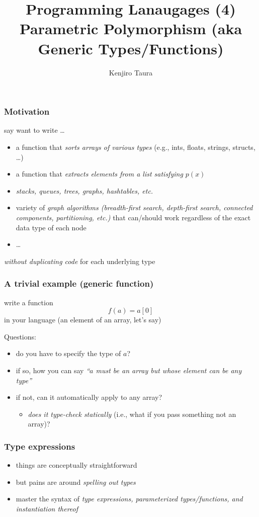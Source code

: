 \documentclass[12pt,dvipdfmx]{beamer}
\title{Programming Lanaugages (4) \\
Parametric Polymorphism (aka Generic Types/Functions)}
\institute{}
\author{Kenjiro Taura}
\date{}
\newcommand{\ao}[1]{{\color{blue}#1}}
\newcommand{\aka}[1]{{\color{red}#1}}
\begin{document}
\maketitle


\begin{frame}[fragile]
  \frametitle{Motivation}
  say want to write \ldots
  \begin{itemize}
  \item a function that \ao{\it sorts arrays of various types}
    (e.g., ints, floats, strings, structs, \ldots)
  \item a function that \ao{\it extracts elements from a list satisfying $p(x)$}
  \item \ao{\it stacks, queues, trees, graphs, hashtables, etc.}
  \item variety of \ao{\it graph algorithms (breadth-first search, depth-first search,
      connected components, partitioning, etc.)}
    that can/should work regardless of the exact data type of each node
  \item \ldots
  \end{itemize}
  \ao{\it without duplicating code} for each underlying type
\end{frame}

\begin{frame}
  \frametitle{A trivial example (generic function)}
  write a function
  \[ f(a) = a[0] \]
  in your language (an element of an array, let's say)

  Questions:
  \begin{itemize}
  \item do you have to specify the type of $a$?
  \item if so, how you can say
    \ao{\it ``$a$ must be an array but whose element can be any type''}
  \item if not, can it automatically apply to any array?
    \begin{itemize}
    \item \ao{\it does it type-check statically}
      (i.e., what if you pass something not an array)?
    \end{itemize}
  \end{itemize}
\end{frame}

\begin{frame}
  \frametitle{Type expressions}
  \begin{itemize}
  \item things are conceptually straightforward
  \item but pains are around \aka{\it spelling out types}
  \item master the syntax of \ao{\it type expressions, parameterized types/functions, and instantiation thereof}
  \end{itemize}
\end{frame}
\end{document}
